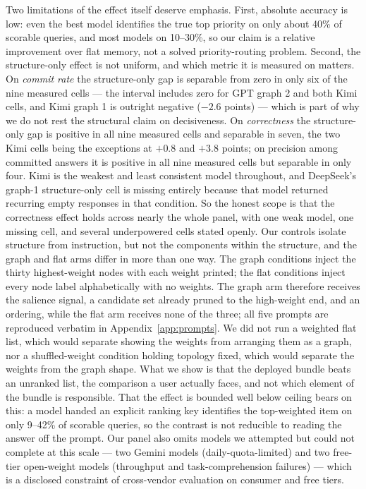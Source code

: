 \documentclass[11pt]{article}
\begin{document}
Two limitations of the effect itself deserve emphasis. First, absolute accuracy is low: even the best model identifies the true top priority on only about 40\% of scorable queries, and most models on 10--30\%, so our claim is a relative improvement over flat memory, not a solved priority-routing problem. Second, the structure-only effect is not uniform, and which metric it is measured on matters. On \emph{commit rate} the structure-only gap is separable from zero in only six of the nine measured cells --- the interval includes zero for GPT graph 2 and both Kimi cells, and Kimi graph 1 is outright negative ($-2.6$ points) --- which is part of why we do not rest the structural claim on decisiveness. On \emph{correctness} the structure-only gap is positive in all nine measured cells and separable in seven, the two Kimi cells being the exceptions at $+0.8$ and $+3.8$ points; on precision among committed answers it is positive in all nine measured cells but separable in only four. Kimi is the weakest and least consistent model throughout, and DeepSeek's graph-1 structure-only cell is missing entirely because that model returned recurring empty responses in that condition. So the honest scope is that the correctness effect holds across nearly the whole panel, with one weak model, one missing cell, and several underpowered cells stated openly. Our controls isolate structure from instruction, but not the components within the structure, and the graph and flat arms differ in more than one way. The graph conditions inject the thirty highest-weight nodes with each weight printed; the flat conditions inject every node label alphabetically with no weights. The graph arm therefore receives the salience signal, a candidate set already pruned to the high-weight end, and an ordering, while the flat arm receives none of the three; all five prompts are reproduced verbatim in Appendix~\ref{app:prompts}. We did not run a weighted flat list, which would separate showing the weights from arranging them as a graph, nor a shuffled-weight condition holding topology fixed, which would separate the weights from the graph shape. What we show is that the deployed bundle beats an unranked list, the comparison a user actually faces, and not which element of the bundle is responsible. That the effect is bounded well below ceiling bears on this: a model handed an explicit ranking key identifies the top-weighted item on only 9--42\% of scorable queries, so the contrast is not reducible to reading the answer off the prompt. Our panel also omits models we attempted but could not complete at this scale --- two Gemini models (daily-quota-limited) and two free-tier open-weight models (throughput and task-comprehension failures) --- which is a disclosed constraint of cross-vendor evaluation on consumer and free tiers.
\end{document}
